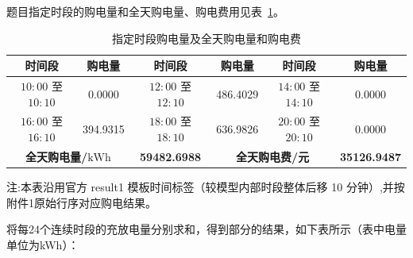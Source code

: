 题目指定时段的购电量和全天购电量、购电费用见表~\ref{tab:q1_selected_purchase}。

\begin{table}[H]
    \centering
    \caption{指定时段购电量及全天购电量和购电费}
    \label{tab:q1_selected_purchase}
    \small
    \setlength{\tabcolsep}{6pt}
    \renewcommand{\arraystretch}{1.25}

    \begin{tabular}{|c|c|c|c|c|c|}
        \hline
        \rowcolor{headerblue}
        \textbf{时间段} & \textbf{购电量}
        & \textbf{时间段} & \textbf{购电量}
        & \textbf{时间段} & \textbf{购电量} \\
        \hline

        \(10{:}00\) 至 \(10{:}10\) & 0.0000
        & \(12{:}00\) 至 \(12{:}10\) & 486.4029
        & \(14{:}00\) 至 \(14{:}10\) & 0.0000 \\
        \hline

        \(16{:}00\) 至 \(16{:}10\) & 394.9315
        & \(18{:}00\) 至 \(18{:}10\) & 636.9826
        & \(20{:}00\) 至 \(20{:}10\) & 0.0000 \\
        \hline

        \multicolumn{2}{|c|}{\textbf{全天购电量/\(\mathrm{kWh}\)}}
        & \cellcolor{datablue}\textbf{59482.6988}
        & \multicolumn{2}{c|}{\textbf{全天购电费/元}}
        & \cellcolor{datablue}\textbf{35126.9487} \\
        \hline
    \end{tabular}

    \par\smallskip
    {\footnotesize
    注:本表沿用官方 result1 模板时间标签（较模型内部时段整体后移 10 分钟）,并按附件1原始行序对应购电结果。
    }
\end{table}

将每24个连续时段的充放电量分别求和，得到部分的结果，如下表所示（表中电量单位为kWh）：


